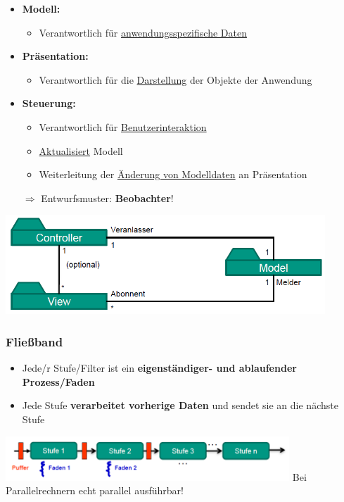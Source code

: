 			\begin{itemize}
				\item \textbf{Modell:}
				\begin{itemize}
					\item Verantwortlich für \underline{anwendungsspezifische Daten}
				\end{itemize}
				\item \textbf{Präsentation:}
				\begin{itemize}
					\item Verantwortlich für die \underline{Darstellung} der Objekte der Anwendung
				\end{itemize}
				\item \textbf{Steuerung:}
				\begin{itemize}
					\item Verantwortlich für \underline{Benutzerinteraktion}
					\item \underline{Aktualisiert} Modell
					\item Weiterleitung der \underline{Änderung von Modelldaten} an Präsentation
				\end{itemize}
				$\Rightarrow$ Entwurfsmuster: \textbf{Beobachter}!
			\end{itemize}	
			\begin{center}
				\includegraphics[width=0.9\textwidth]{../images/mvc.png}
			\end{center}
			
		\subsubsection{Fließband}
					
			\begin{itemize}
				\item Jede/r Stufe/Filter ist ein \textbf{eigenständiger- und ablaufender Prozess/Faden}
				\item Jede Stufe \textbf{verarbeitet vorherige Daten} und sendet sie an die nächste Stufe
			\end{itemize}
				
			\begin{center}
				\includegraphics[width=0.8\textwidth]{../images/fliessband.png}
				Bei Parallelrechnern echt parallel ausführbar!
			\end{center}
				
